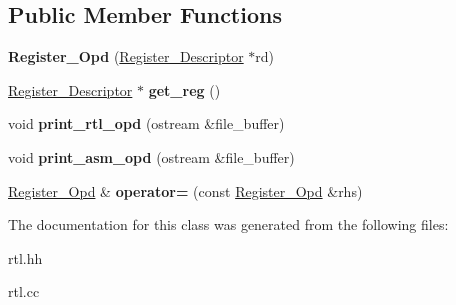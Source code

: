 \subsection*{Public Member Functions}
\begin{DoxyCompactItemize}
\item 
\mbox{\label{classRegister__Opd_ad2ece6a529a3d99a430aec7115b088c2}} 
{\bfseries Register\+\_\+\+Opd} (\hyperlink{classRegister__Descriptor}{Register\+\_\+\+Descriptor} $\ast$rd)
\item 
\mbox{\label{classRegister__Opd_af946a7d2ed452bac6799305301e4dc75}} 
\hyperlink{classRegister__Descriptor}{Register\+\_\+\+Descriptor} $\ast$ {\bfseries get\+\_\+reg} ()
\item 
\mbox{\label{classRegister__Opd_ac909524fc9f8fa2039a0b132c14351b4}} 
void {\bfseries print\+\_\+rtl\+\_\+opd} (ostream \&file\+\_\+buffer)
\item 
\mbox{\label{classRegister__Opd_ab45b70ad1f1b939665627f7eb633c00c}} 
void {\bfseries print\+\_\+asm\+\_\+opd} (ostream \&file\+\_\+buffer)
\item 
\mbox{\label{classRegister__Opd_a2870cb4e861064eabbd15c909938c2e4}} 
\hyperlink{classRegister__Opd}{Register\+\_\+\+Opd} \& {\bfseries operator=} (const \hyperlink{classRegister__Opd}{Register\+\_\+\+Opd} \&rhs)
\end{DoxyCompactItemize}


The documentation for this class was generated from the following files\+:\begin{DoxyCompactItemize}
\item 
rtl.\+hh\item 
rtl.\+cc\end{DoxyCompactItemize}
